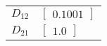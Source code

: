 \begin{tabular}{cl}
 $D_{12}$ & $\left[\begin{matrix}0.1001\end{matrix}\right]$                                                                                                                                                                                                                                                                                                                                                                                                                                                                                                                                                                                          \\
 $D_{21}$ & $\left[\begin{matrix}1.0\end{matrix}\right]$                                                                                                                                                                                                                                                                                                                                                                                                                                                                                                                                                                                             \\
\hline
\end{tabular}